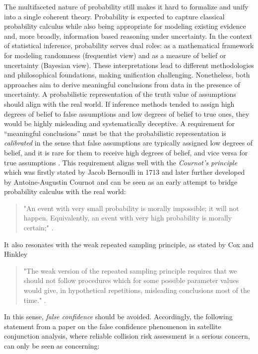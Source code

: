 \documentclass[
]{report}
\theoremstyle{definition}
\theoremstyle{definition}
\begin{document}
The multifaceted nature of probability still makes it hard to formalize
and unify into a single coherent theory. Probability is expected to
capture classical probability calculus while also being appropriate for
modeling existing evidence and, more broadly, information based
reasoning under uncertainty. In the context of statistical inference,
probability serves dual roles: as a mathematical framework for modeling
randomness (frequentist view) and as a measure of belief or uncertainty
(Bayesian view). These interpretations lead to different methodologies
and philosophical foundations, making unification challenging.
Nonetheless, both approaches aim to derive meaningful conclusions from
data in the presence of uncertainty. A probabilistic representation of
the truth value of assumptions should align with the real world. If
inference methods tended to assign high degrees of belief to false
assumptions and low degrees of belief to true ones, they would be highly
misleading and systematically deceptive. A requirement for ``meaningful
conclusions'' must be that the probabilistic representation is
\textit{calibrated} in the sense that false assumptions are typically
assigned low degrees of belief, and it is rare for them to receive high
degrees of belief, and vice versa for true assumptions
\cite{martin_false_2019}. This requirement aligns well with the
\textit{Cournot's principle} which was firstly stated by Jacob Bernoulli
in 1713 and later further developed by Antoine-Augustin Cournot and can
be seen as an early attempt to bridge probability calculus with the real
world:

\begin{quote}
"An event with very small probability is morally impossible; it will not happen. Equivalently, an event with very high probability is morally certain;" \cite{shafer_origins_2018}.
\end{quote}

It also resonates with the weak repeated sampling principle, as stated
by Cox and Hinkley

\begin{quote}
"The weak version of the repeated sampling principle requires that we should not follow procedures which for some possible parameter values would give, in hypothetical repetitions, misleading conclusions most of the time." \cite[p.~45--46]{cox_theoretical_1979}.
\end{quote}

In this sense, \textit{false confidence} should be avoided. Accordingly,
the following statement from a paper on the false confidence phenomenon
in satellite conjunction analysis, where reliable collision risk
assessment is a serious concern, can only be seen as concerning:
\end{document}
